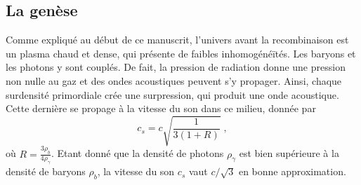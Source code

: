 \documentclass[11pt, twoside, a4paper, openright]{report}
\begin{document}
\subsection{La genèse}
Comme expliqué au début de ce manuscrit, l'univers avant la recombinaison est un plasma chaud et dense, qui présente de faibles inhomogénéïtés.
Les baryons et les photons y sont couplés. De fait, la pression de radiation donne une pression non nulle au gaz et des ondes acoustiques peuvent s'y propager. Ainsi, chaque surdensité primordiale crée une surpression, qui produit une onde acoustique. Cette dernière se propage à la vitesse du son dans ce milieu, donnée par
\begin{equation}
  \label{eq:sound_speed}
  c_{s} = c \sqrt{\frac{1}{3(1 + R)}} \; ,
\end{equation}
où $R = \frac{3\rho_b}{4\rho_{\gamma}}$. Etant donné que la densité de photons $\rho_{\gamma}$ est bien supérieure à la densité de baryons $\rho_{b}$, la vitesse du son $c_s$ vaut $c/\sqrt{3}$ en bonne approximation.
\end{document}
